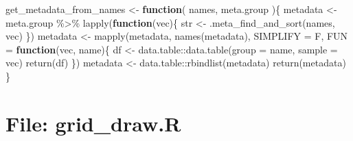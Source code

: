 \documentclass[
]{article}
\newenvironment{Shaded}{\begin{snugshade}}{\end{snugshade}}
\newcommand{\AttributeTok}[1]{\textcolor[rgb]{0.77,0.63,0.00}{#1}}
\newcommand{\ControlFlowTok}[1]{\textcolor[rgb]{0.13,0.29,0.53}{\textbf{#1}}}
\newcommand{\FunctionTok}[1]{\textcolor[rgb]{0.00,0.00,0.00}{#1}}
\newcommand{\NormalTok}[1]{#1}
\newcommand{\OtherTok}[1]{\textcolor[rgb]{0.56,0.35,0.01}{#1}}
\newcommand{\SpecialCharTok}[1]{\textcolor[rgb]{0.00,0.00,0.00}{#1}}
\begin{document}
\begin{Shaded}
\begin{Highlighting}[]
\NormalTok{get\_metadata\_from\_names }\OtherTok{\textless{}{-}} 
  \ControlFlowTok{function}\NormalTok{(}
\NormalTok{           names,}
\NormalTok{           meta.group}
\NormalTok{           )\{}
\NormalTok{    metadata }\OtherTok{\textless{}{-}}\NormalTok{ meta.group }\SpecialCharTok{\%\textgreater{}\%} 
      \FunctionTok{lapply}\NormalTok{(}\ControlFlowTok{function}\NormalTok{(vec)\{}
\NormalTok{               str }\OtherTok{\textless{}{-}} \FunctionTok{.meta\_find\_and\_sort}\NormalTok{(names, vec)}
\NormalTok{           \})}
\NormalTok{    metadata }\OtherTok{\textless{}{-}} \FunctionTok{mapply}\NormalTok{(metadata, }\FunctionTok{names}\NormalTok{(metadata), }\AttributeTok{SIMPLIFY =}\NormalTok{ F,}
                       \AttributeTok{FUN =} \ControlFlowTok{function}\NormalTok{(vec, name)\{}
\NormalTok{                         df }\OtherTok{\textless{}{-}}\NormalTok{ data.table}\SpecialCharTok{::}\FunctionTok{data.table}\NormalTok{(}\AttributeTok{group =}\NormalTok{ name, }\AttributeTok{sample =}\NormalTok{ vec)}
                         \FunctionTok{return}\NormalTok{(df)}
\NormalTok{                       \})}
\NormalTok{    metadata }\OtherTok{\textless{}{-}}\NormalTok{ data.table}\SpecialCharTok{::}\FunctionTok{rbindlist}\NormalTok{(metadata)}
    \FunctionTok{return}\NormalTok{(metadata)}
\NormalTok{  \}}
\end{Highlighting}
\end{Shaded}

\hypertarget{file-grid_draw.r}{%
\section{File: grid\_draw.R}\label{file-grid_draw.r}}
\end{document}
